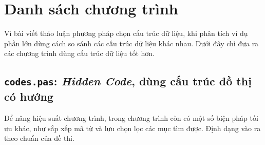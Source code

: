 \documentclass[11pt]{article}
\begin{document}
\section{Danh sách chương trình}

Vì bài viết thảo luận phương pháp chọn cấu trúc dữ liệu, khi phân tích ví dụ
phần lớn dùng cách so sánh các cấu trúc dữ liệu khác nhau. Dưới đây chỉ đưa
ra các chương trình dùng cấu trúc dữ liệu tốt hơn.

\subsection{\texttt{codes.pas}: \textit{Hidden Code}, dùng cấu trúc đồ thị có hướng}

Để nâng hiệu suất chương trình, trong chương trình còn có một số biện pháp
tối ưu khác, như sắp xếp mã từ và lưu chọn lọc các mục tìm được. Định dạng
vào ra theo chuẩn của đề thi.
\end{document}
